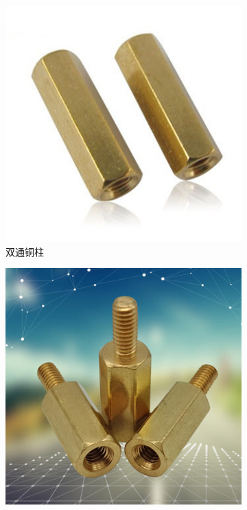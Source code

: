 \documentclass[UTF8]{article} %
\begin{document}
\begin{figure}[H]
  \centering
  \begin{subfigure}[b]{0.21\textwidth}
         \centering
         \includegraphics[width=\textwidth]{tong1.png}
          \caption{双通铜柱}
  \end{subfigure}
  \quad
  \begin{subfigure}[b]{0.21\textwidth}
          \centering
          \includegraphics[width=\textwidth]{tong2.png}

\end{subfigure}
\end{figure}
\end{document}
